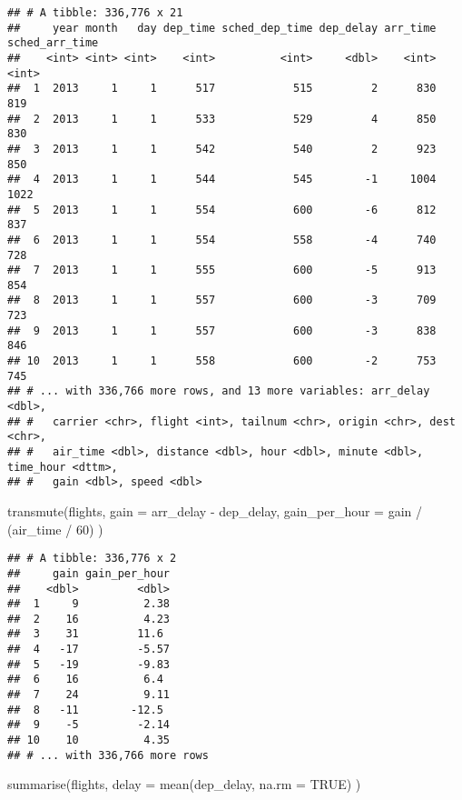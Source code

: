 \documentclass[
]{article}
\newenvironment{Shaded}{\begin{snugshade}}{\end{snugshade}}
\newcommand{\AttributeTok}[1]{\textcolor[rgb]{0.77,0.63,0.00}{#1}}
\newcommand{\ConstantTok}[1]{\textcolor[rgb]{0.00,0.00,0.00}{#1}}
\newcommand{\DecValTok}[1]{\textcolor[rgb]{0.00,0.00,0.81}{#1}}
\newcommand{\FunctionTok}[1]{\textcolor[rgb]{0.00,0.00,0.00}{#1}}
\newcommand{\NormalTok}[1]{#1}
\newcommand{\SpecialCharTok}[1]{\textcolor[rgb]{0.00,0.00,0.00}{#1}}
\begin{document}
\begin{verbatim}
## # A tibble: 336,776 x 21
##     year month   day dep_time sched_dep_time dep_delay arr_time sched_arr_time
##    <int> <int> <int>    <int>          <int>     <dbl>    <int>          <int>
##  1  2013     1     1      517            515         2      830            819
##  2  2013     1     1      533            529         4      850            830
##  3  2013     1     1      542            540         2      923            850
##  4  2013     1     1      544            545        -1     1004           1022
##  5  2013     1     1      554            600        -6      812            837
##  6  2013     1     1      554            558        -4      740            728
##  7  2013     1     1      555            600        -5      913            854
##  8  2013     1     1      557            600        -3      709            723
##  9  2013     1     1      557            600        -3      838            846
## 10  2013     1     1      558            600        -2      753            745
## # ... with 336,766 more rows, and 13 more variables: arr_delay <dbl>,
## #   carrier <chr>, flight <int>, tailnum <chr>, origin <chr>, dest <chr>,
## #   air_time <dbl>, distance <dbl>, hour <dbl>, minute <dbl>, time_hour <dttm>,
## #   gain <dbl>, speed <dbl>
\end{verbatim}

\begin{Shaded}
\begin{Highlighting}[]
\FunctionTok{transmute}\NormalTok{(flights,}
  \AttributeTok{gain =}\NormalTok{ arr\_delay }\SpecialCharTok{{-}}\NormalTok{ dep\_delay,}
  \AttributeTok{gain\_per\_hour =}\NormalTok{ gain }\SpecialCharTok{/}\NormalTok{ (air\_time }\SpecialCharTok{/} \DecValTok{60}\NormalTok{)}
\NormalTok{)}
\end{Highlighting}
\end{Shaded}

\begin{verbatim}
## # A tibble: 336,776 x 2
##     gain gain_per_hour
##    <dbl>         <dbl>
##  1     9          2.38
##  2    16          4.23
##  3    31         11.6 
##  4   -17         -5.57
##  5   -19         -9.83
##  6    16          6.4 
##  7    24          9.11
##  8   -11        -12.5 
##  9    -5         -2.14
## 10    10          4.35
## # ... with 336,766 more rows
\end{verbatim}

\begin{Shaded}
\begin{Highlighting}[]
\FunctionTok{summarise}\NormalTok{(flights,}
  \AttributeTok{delay =} \FunctionTok{mean}\NormalTok{(dep\_delay, }\AttributeTok{na.rm =} \ConstantTok{TRUE}\NormalTok{)}
\NormalTok{)}
\end{Highlighting}
\end{Shaded}
\end{document}
